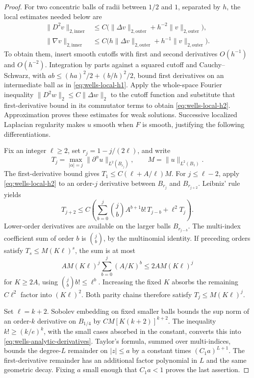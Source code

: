 \begin{proof}
For two concentric balls of radii between \(1/2\) and \(1\), separated
by \(h\), the local estimates needed below are
\begin{align}
 \|D^2v\|_{2,\mathrm{inner}}
 &\le C\bigl(\|\Delta v\|_{2,\mathrm{outer}}
                   +h^{-2}\|v\|_{2,\mathrm{outer}}\bigr),
 \label{eq:wells-local-h2}\\
 \|\nabla v\|_{2,\mathrm{inner}}
 &\le C\bigl(h\|\Delta v\|_{2,\mathrm{outer}}
                   +h^{-1}\|v\|_{2,\mathrm{outer}}\bigr).
 \label{eq:wells-local-h1}
\end{align}
To obtain them, insert smooth cutoffs with first and second derivatives
\(O(h^{-1})\) and \(O(h^{-2})\). Integration by parts against a squared
cutoff and Cauchy--Schwarz, with \(ab\le (h a)^2/2+(b/h)^2/2\),
bound first derivatives on an intermediate ball as in
\eqref{eq:wells-local-h1}. Apply the whole-space Fourier inequality
\(\|D^2w\|_2\le C\|\Delta w\|_2\) to the cutoff function and substitute
that first-derivative bound in its commutator terms to obtain
\eqref{eq:wells-local-h2}. Approximation proves these estimates for
weak solutions. Successive localized Laplacian regularity makes \(u\)
smooth when \(F\) is smooth, justifying the following differentiations.

Fix an integer \(\ell\ge2\), set \(r_j=1-j/(2\ell)\), and write
\[
 T_j=\max_{|\alpha|=j}\|\partial^\alpha u\|_{L^2(B_{r_j})},
 \qquad M=\|u\|_{L^2(B_1)}.
\]
The first-derivative bound gives \(T_1\le C(\ell+A/\ell)M\).
For \(j\le\ell-2\), apply \eqref{eq:wells-local-h2} to an order-\(j\)
derivative between \(B_{r_j}\) and \(B_{r_{j+2}}\).
Leibniz' rule yields
\begin{equation}
 T_{j+2}\le C\left(
  \sum_{b=0}^j\binom jb A^{b+1}b!\,T_{j-b}
  +\ell^2T_j\right).
 \label{eq:wells-analytic-recurrence}
\end{equation}
Lower-order derivatives are available on the larger balls
\(B_{r_{j-b}}\). The multi-index coefficient sum of order \(b\)
is \(\binom jb\), by the multinomial identity.
If preceding orders satisfy \(T_s\le M(K\ell)^s\), the sum is at most
\[
 AM(K\ell)^j\sum_{b=0}^j(A/K)^b
 \le2AM(K\ell)^j
\]
for \(K\ge2A\), using \(\binom jb b!\le\ell^b\).
Increasing the fixed \(K\) absorbs the remaining \(C\ell^2\) factor
into \((K\ell)^2\). Both parity chains therefore satisfy
\(T_j\le M(K\ell)^j\).

Set \(\ell=k+2\). Sobolev embedding on fixed smaller balls bounds the
sup norm of an order-\(k\) derivative on \(B_{1/4}\) by
\(CM[K(k+2)]^{k+2}\).
The inequality \(k!\ge(k/e)^k\), with the small cases absorbed in
the constant, converts this into \eqref{eq:wells-analytic-derivatives}.
Taylor's formula, summed over multi-indices, bounds the degree-\(L\)
remainder on \(|z|\le a\) by a constant times \((C_1a)^{L+1}\).
The first-derivative remainder has an additional factor polynomial
in \(L\) and the same geometric decay. Fixing \(a\) small enough that
\(C_1a<1\) proves the last assertion.
\end{proof}

